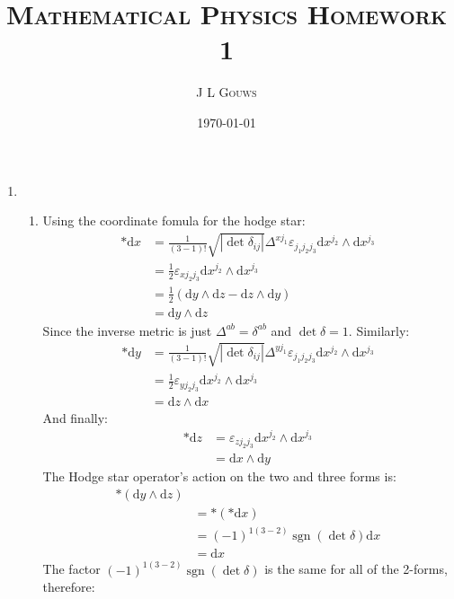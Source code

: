 \documentclass[12pt,a4]{article}
\title{
\textsc{Mathematical Physics Homework 1}
}
\author{\textsc{J L Gouws}
}
\date{\today
\\[1cm]}
\DeclareMathOperator{\sign}{sgn}
\newcommand{\e}{\mathrm{d}}
\begin{document}
\thispagestyle{empty}

\maketitle

\begin{enumerate}
  \item
    \begin{enumerate}
      \item
        Using the coordinate fomula for the hodge star:
        \begin{align*}
          * \e x &= \frac{1}{(3 - 1)!} \sqrt{|\det{\delta_{ij}}|} \Delta^{x j_1} \varepsilon_{j_1 j_2 j_3} \e x^{j_2} \wedge \e x^{j_3}\\
                 &= \frac{1}{2} \varepsilon_{x j_2 j_3} \e x^{j_2} \wedge \e x^{j_3}\\
                 &= \frac{1}{2} \left(\e y \wedge \e z - \e z \wedge \e y\right)\\
                 &= \e y \wedge \e z
        \end{align*}
        Since the inverse metric is just $\Delta^{ab} = \delta^{ab}$ and $\det \delta = 1$.
        Similarly:
        \begin{align*}
          * \e y &= \frac{1}{(3 - 1)!} \sqrt{|\det{\delta_{ij}}|} \Delta^{y j_1} \varepsilon_{j_1 j_2 j_3} \e x^{j_2} \wedge \e x^{j_3}\\
                 &= \frac{1}{2} \varepsilon_{y j_2 j_3} \e x^{j_2} \wedge \e x^{j_3}\\
                 &= \e z \wedge \e x
        \end{align*}
        And finally:
        \begin{align*}
          * \e z &= \varepsilon_{z j_2 j_3} \e x^{j_2} \wedge \e x^{j_3}\\
                 &= \e x \wedge \e y
        \end{align*}
        The Hodge star operator's action on the two and three forms is:
        \begin{align*}
          * (\e y \wedge \e z)\\
                  &= *(* \e x)\\
                  &= (-1)^{1(3 - 2)}\sign(\det \delta) \e x\\
                  &= \e x
        \end{align*}
        The factor $(-1)^{1(3 - 2)}\sign(\det \delta)$ is the same for all of the 2-forms, therefore:
        \begin{equation*}

\end{equation*}
\end{enumerate}
\end{enumerate}
\end{document}
